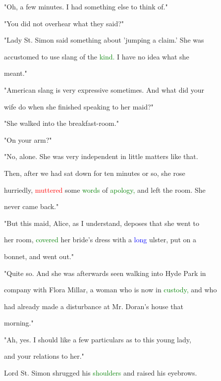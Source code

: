  "Oh, a few minutes. I had something else to think of."



 "You did not overhear what they said?"



 "Lady St. Simon said something about 'jumping a claim.' She was

 accustomed to use slang of the \textcolor{green}{kind.} I have no idea what she

 meant."



 "American slang is very expressive sometimes. And what did your

 wife do when she finished speaking to her maid?"



 "She walked into the breakfast-room."



 "On your arm?"



 "No, alone. She was very independent in little matters like that.

 Then, after we had sat down for ten minutes or so, she rose

 hurriedly, \textcolor{red}{muttered} some \textcolor{green}{words} of \textcolor{green}{apology,} and left the room. She

 never came back."



 "But this maid, Alice, as I understand, deposes that she went to

 her room, \textcolor{green}{covered} her \textcolor{BurntOrange}{bride's} dress with a \textcolor{blue}{long} ulster, put on a

 bonnet, and went out."



 "Quite so. And she was afterwards seen walking into Hyde Park in

 company with Flora Millar, a woman who is now in \textcolor{green}{custody,} and who

 had already made a \textcolor{BurntOrange}{disturbance} at Mr. Doran's house that

 morning."



 "Ah, yes. I should like a few particulars as to this \textcolor{BurntOrange}{young} lady,

 and your relations to her."



 \textcolor{BurntOrange}{Lord} St. Simon shrugged his \textcolor{green}{shoulders} and raised his eyebrows.

